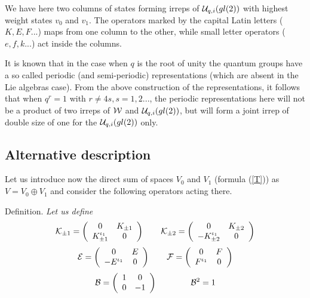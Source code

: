 \documentclass[a4paper,a4paper]{article}
\begin{document}

We have here two columns of states forming irreps of ${\cal U}_{q,i}(gl(2))$
with highest weight states $v_0$ and $v_1$. The operators marked by
the capital Latin 
letters ($K, E, F...$) maps from one column to the other, while small
letter operators ($e, f, k...$) act inside the columns.

It is known that in the case when $q$ is the root of unity the quantum
groups have a so called periodic (and semi-periodic) representations
(which are absent in the Lie algebras case). From the above construction 
of the representations, it follows that when
$q^r=1$ with $r\neq 4s, s=1,2...$, the periodic representations
here will not be a product of two irreps of ${\cal W}$ and ${\cal U}_{q,i}(gl(2))$,
but will form a joint irrep of double size of one for the
${\cal U}_{q,i}(gl(2))$ only.

\subsection{Alternative description}

Let us introduce now the direct sum of spaces $V_0$ and $V_1$
(formula (\ref{T})) as  $V=V_0 \oplus V_1$ and consider the following
operators acting there.
\medskip

\noindent
{\large \sc Definition.} 
\textsl{Let us define
\begin{equation}
  \label{eq:uK1}
  {\cal K}_{\pm 1} = \left(
    \begin{array}{cc}
      0 & K_{\pm 1} \\
      K_{\pm 1}^{\iota_1} & 0
    \end{array}
  \right)
  \qquad
  \label{eq:uK2}
  {\cal K}_{\pm 2} = \left(
    \begin{array}{cc}
      0 & K_{\pm 2} \\
      - K_{\pm 2}^{\iota_1} & 0
    \end{array}
  \right)
\end{equation}
\begin{equation}
  \label{eq:uE}
  {\cal E} = \left(
    \begin{array}{cc}
      0 & E \\
      - E^{\iota_1} & 0
    \end{array}
  \right)
  \qquad
  \label{eq:uF}
  {\cal F} = \left(
    \begin{array}{cc}
      0 & F \\
      F^{\iota_1} & 0
    \end{array}
  \right)
\end{equation}
\begin{equation}
  \label{eq:uL}
  {\cal B} = \left(
    \begin{array}{cc}
      1 & 0 \\
      0 & -1
    \end{array}
  \right)
\qquad \qquad {\cal B}^2 = 1
\end{equation}
}
\end{document}
